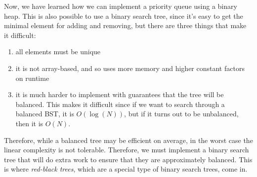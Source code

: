 \documentclass{article}
\begin{document}
    Now, we have learned how we can implement a priority queue using a binary heap. This is also possible to use a binary search tree, since it's easy to get the minimal element for adding and removing, but there are three things that make it difficult: 
    \begin{enumerate}
        \item all elements must be unique 
        \item it is not array-based, and so uses more memory and higher constant factors on runtime 
        \item it is much harder to implement with guarantees that the tree will be balanced. This makes it difficult since if we want to search through a balanced BST, it is $O(\log(N))$, but if it turns out to be unbalanced, then it is $O(N)$. 
    \end{enumerate}
    Therefore, while a balanced tree may be efficient on average, in the worst case the linear complexity is not tolerable. Therefore, we must implement a binary search tree that will do extra work to ensure that they are approximately balanced. This is where \textit{red-black trees}, which are a special type of binary search trees, come in.  
\end{document}
